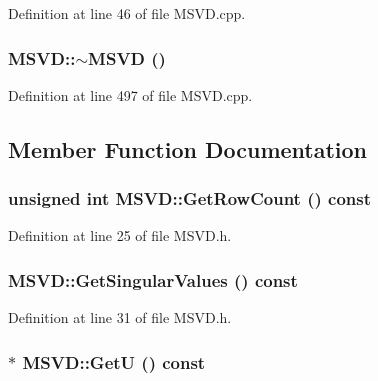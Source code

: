 Definition at line 46 of file MSVD.cpp.\hypertarget{class_m_s_v_d_5a285d1e3c1b798b6028c6af60bf57bf}{
\subsubsection[{$\sim$MSVD}]{\setlength{\rightskip}{0pt plus 5cm}MSVD::$\sim$MSVD ()}}
\label{class_m_s_v_d_5a285d1e3c1b798b6028c6af60bf57bf}




Definition at line 497 of file MSVD.cpp.

\subsection{Member Function Documentation}
\hypertarget{class_m_s_v_d_fa55a5805b169af65ca66ee6703fffbe}{
\subsubsection[{GetRowCount}]{\setlength{\rightskip}{0pt plus 5cm}unsigned int MSVD::GetRowCount () const}}
\label{class_m_s_v_d_fa55a5805b169af65ca66ee6703fffbe}




Definition at line 25 of file MSVD.h.\hypertarget{class_m_s_v_d_8b52a085ef301a2c754c4dbe425f6a2b}{
\subsubsection[{GetSingularValues}]{ MSVD::GetSingularValues () const}}
\label{class_m_s_v_d_8b52a085ef301a2c754c4dbe425f6a2b}




Definition at line 31 of file MSVD.h.\hypertarget{class_m_s_v_d_45fa81afbfc64857e14e6378237f7f18}{
\subsubsection[{GetU}]{$\ast$ MSVD::GetU () const}}
\label{class_m_s_v_d_45fa81afbfc64857e14e6378237f7f18}




